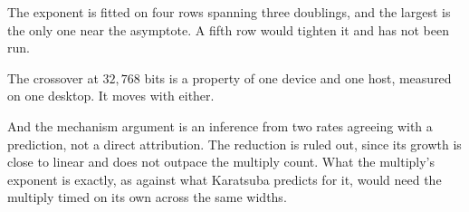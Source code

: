The exponent is fitted on four rows spanning three doublings, and the largest is the only one near the asymptote. A fifth row would tighten it and has not been run.

The crossover at \(32{,}768\) bits is a property of one device and one host, measured on one desktop. It moves with either.

And the mechanism argument is an inference from two rates agreeing with a prediction, not a direct attribution. The reduction is ruled out, since its growth is close to linear and does not outpace the multiply count. What the multiply's exponent is exactly, as against what Karatsuba predicts for it, would need the multiply timed on its own across the same widths.
